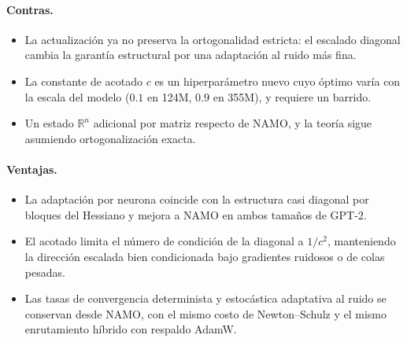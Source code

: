 \paragraph{Contras.}
\begin{itemize}[leftmargin=*]
\item La actualización ya no preserva la ortogonalidad estricta: el escalado diagonal
  cambia la garantía estructural por una adaptación al ruido más fina.
\item La constante de acotado $c$ es un hiperparámetro nuevo cuyo óptimo varía con la
  escala del modelo ($0.1$ en 124M, $0.9$ en 355M), y requiere un barrido.
\item Un estado $\mathbb{R}^n$ adicional por matriz respecto de NAMO, y la teoría sigue
  asumiendo ortogonalización exacta.
\end{itemize}

\paragraph{Ventajas.}
\begin{itemize}[leftmargin=*]
\item La adaptación por neurona coincide con la estructura casi diagonal por bloques del
  Hessiano y mejora a NAMO en ambos tamaños de GPT-2.
\item El acotado limita el número de condición de la diagonal a $1/c^2$, manteniendo la
  dirección escalada bien condicionada bajo gradientes ruidosos o de colas pesadas.
\item Las tasas de convergencia determinista y estocástica adaptativa al ruido se
  conservan desde NAMO, con el mismo costo de Newton--Schulz y el mismo enrutamiento
  híbrido con respaldo AdamW.
\end{itemize}

